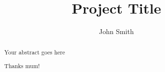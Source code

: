 \documentclass[a4paper, twoside]{report}
\title{Project Title}
\author{John Smith}
\begin{document}


\begin{abstract}
Your abstract goes here
\end{abstract}

\renewcommand{\abstractname}{Acknowledgements}
\begin{abstract}
Thanks mum!
\end{abstract}

\tableofcontents
\listoffigures
\listoftables













\end{document}
